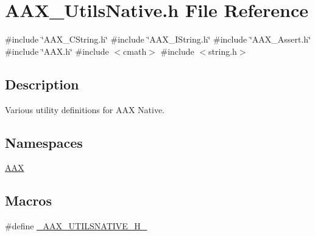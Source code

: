 \hypertarget{a00686}{}\section{A\+A\+X\+\_\+\+Utils\+Native.\+h File Reference}
\label{a00686}
{\ttfamily \#include \char`\"{}A\+A\+X\+\_\+\+C\+String.\+h\char`\"{}}\newline
{\ttfamily \#include \char`\"{}A\+A\+X\+\_\+\+I\+String.\+h\char`\"{}}\newline
{\ttfamily \#include \char`\"{}A\+A\+X\+\_\+\+Assert.\+h\char`\"{}}\newline
{\ttfamily \#include \char`\"{}A\+A\+X.\+h\char`\"{}}\newline
{\ttfamily \#include $<$cmath$>$}\newline
{\ttfamily \#include $<$string.\+h$>$}\newline


\subsection{Description}
Various utility definitions for A\+AX Native. 

\subsection*{Namespaces}
\begin{DoxyCompactItemize}
\item 
 \mbox{\hyperlink{a00852}{A\+AX}}
\end{DoxyCompactItemize}
\subsection*{Macros}
\begin{DoxyCompactItemize}
\item 
\#define \mbox{\hyperlink{a00686_a965532f32e277e8db47e16180161827e}{\+\_\+\+A\+A\+X\+\_\+\+U\+T\+I\+L\+S\+N\+A\+T\+I\+V\+E\+\_\+\+H\+\_\+}}
\end{DoxyCompactItemize}
